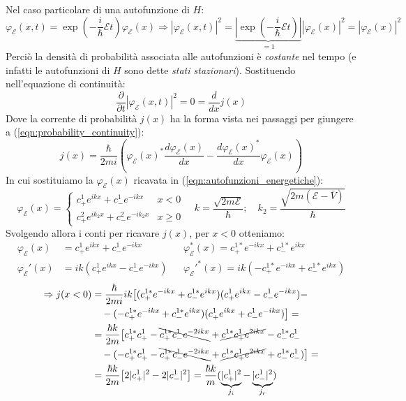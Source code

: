 \documentclass[../../FisicaTeorica.tex]{subfiles}
\begin{document}
Nel caso particolare di una autofunzione di $H$:
\[
\varphi_\mathcal{E}(x,t)=\exp\left({-\frac{i}{\hbar}\mathcal{E}t}\right)\varphi_{\mathcal{E}}(x)
\Rightarrow |\varphi_\mathcal{E}(x,t)|^2=
\underbrace{\left |\exp\left({-\frac{i}{\hbar}\mathcal{E}t}\right)\right|
}_{=1}|\varphi_\mathcal{E}(x)|^2 =|\varphi_\mathcal{E}(x)|^2
\]
Perciò la densità di probabilità associata alle autofunzioni è \textit{costante} nel tempo (e infatti le autofunzioni di $H$ sono dette \textit{stati stazionari}). Sostituendo nell'equazione di continuità:
\[
\frac{\partial}{\partial t}|\varphi_\mathcal{E}(x,t)|^2=0=
\frac{d}{dx}j(x)
\]
Dove la corrente di probabilità $j(x)$ ha la forma vista nei passaggi per giungere a (\ref{eqn:probability_continuity}):
\[
j(x)=\frac{\hbar}{2mi}\left(\varphi_\mathcal{E}(x)^* \frac{d\varphi_\mathcal{E}(x)}{dx}-\frac{d\varphi_\mathcal{E}(x)^*}{dx}\varphi_\mathcal{E}(x)\right)
\]
In cui sostituiamo la $\varphi_\mathcal{E}(x)$ ricavata in (\ref{eqn:autofunzioni_energetiche}):
\[
\varphi_\mathcal{E}(x) = \begin{cases}
c^1_+ e^{ikx}+c^1_- e^{-ikx} & x < 0\\
c^2_+ e^{ik_2 x} + c^2_- e^{-i k_2 x} & x\geq 0
\end{cases} \quad k=\frac{\sqrt{2m\mathcal{E}}}{\hbar};\quad k_2=\frac{\sqrt{2m(\mathcal{E}-\bar{V})}}{\hbar}
\]
Svolgendo allora i conti per ricavare $j(x)$, per $x<0$ otteniamo:
\begin{align*}
\varphi_\mathcal{E}(x)&=c^1_+ e^{ikx} + c^1_- e^{-ikx} && \varphi_\mathcal{E}^*(x)=c^{1*}_+ e^{-ikx}+c^{1*}_-e^{ikx}\\
\varphi_\mathcal{E}'(x)&=ik(c^1_+ e^{ikx}-c^1_-e^{-ikx})&&\varphi_\mathcal{E}'^*(x)=ik(-c^{1*}_+e^{-ikx}+c^{1*}_-e^{ikx})
\end{align*}
\begin{align*}
\Rightarrow j(x<0) &= \frac{\hbar}{2mi}ik \big [
(c^{1*}_+e^{-ikx}+c^{1*}_-e^{ikx})(c^1_+ e^{ikx}-c^1_-e^{-ikx})-
\\&\quad
-(-c^{1*}_+ e^{-ikx}+c_-^{1*}e^{ikx})(c^1_+e^{ikx}+c^1_-e^{-ikx})\big ] =\\
&=\frac{\hbar k}{2m}\big[
c^{1*}_+ c^1_+ - \bcancel{c^{1*}_+c^1_-e^{-2ikx}} + \cancel{c^{1*}_-c^1_+e^{2ikx}}-c^{1*}_-c^1_-\\
&\quad-(-c^{1*}_+c^1_+-\bcancel{c^{1*}_+c^1_-e^{-2ikx}}+\cancel{c^{1*}_-c^1_+ e^{2ikx}}+c^{1*}_-c^1_-)\big] =\\
&=\frac{\hbar k}{2m}\big[2|c^1_+|^2-2|c^1_-|^2
\big] =\frac{\hbar k}{m}(\underbrace{|c^1_+|^2}_{j_i}-\underbrace{|c^1_-|^2}_{j_r})
\end{align*}
\end{document}
